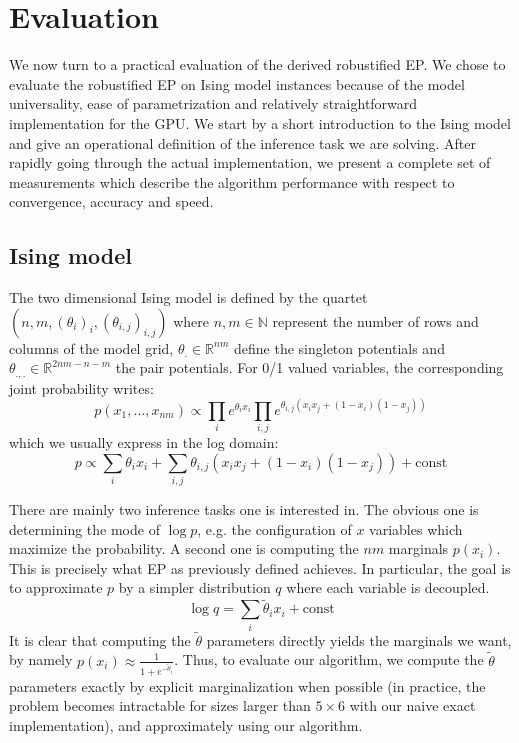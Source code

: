 \documentclass[times, 10pt,twocolumn]{article}
\begin{document}
\section{Evaluation}
We now turn to a practical evaluation of the derived robustified EP. We chose to evaluate the robustified EP on Ising model instances because of the model universality, ease of parametrization and relatively straightforward implementation for the GPU. We start by a short introduction to the Ising model and give an operational definition of the inference task we are solving. After rapidly going through the actual implementation, we present a complete set of measurements which describe the algorithm performance with respect to convergence, accuracy and speed.

\subsection{Ising model}
The two dimensional Ising model is defined by the quartet $(n, m, (\theta_i)_i, (\theta_{i,j})_{i,j})$ where $n, m \in \mathbb{N}$ represent the number of rows and columns of the model grid, $\theta_. \in \mathbb{R}^{nm}$ define the singleton potentials and $\theta_{.,.} \in \mathbb{R}^{2nm-n-m}$ the pair potentials. For 0/1 valued variables, the corresponding joint probability writes:
\[
	p(x_1,\dots,x_{nm}) \propto \prod_i e^{\theta_i x_i} \prod_{i,j} e^{\theta_{i,j} (x_i x_j + (1-x_i)(1-x_j))}
\]
which we usually express in the log domain:
\[
	p \propto \sum_i \theta_i x_i + \sum_{i,j} \theta_{i,j} (x_i x_j
  + (1-x_i)(1-x_j)) + \mathrm{const}
\]

There are mainly two inference tasks one is interested in. The
obvious one is determining the mode of $\log p$, e.g. the
configuration of $x$ variables which maximize the probability. A
second one is computing the $nm$ marginals $p(x_i)$. This is
precisely what EP as previously defined achieves. In particular,
the goal is to approximate $p$ by a simpler distribution $q$ where each variable is decoupled. 
\[
\log q = \sum_i \tilde \theta_i x_i + \mathrm{const}
\]
It is clear that computing the $\tilde \theta$ parameters directly yields the marginals we want, by namely $p(x_i) \approx \frac{1}{1+e^{-\tilde \theta_i}}$. Thus, to evaluate our algorithm, we compute the $\tilde \theta$ parameters exactly by explicit marginalization when possible (in practice, the problem becomes intractable for sizes larger than $5 \times 6$ with our naive exact implementation), and approximately using our algorithm.
\end{document}
